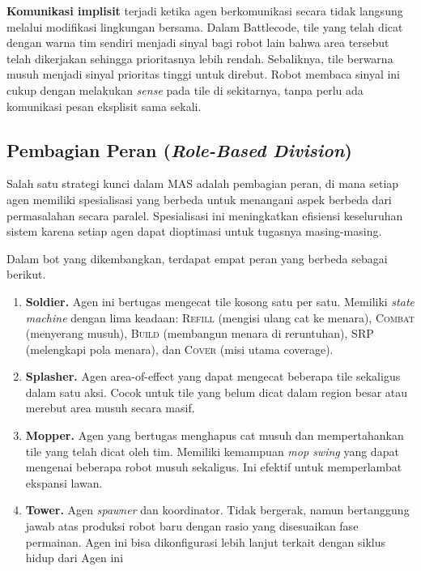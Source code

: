 \textbf{Komunikasi implisit} terjadi ketika agen berkomunikasi secara tidak langsung melalui modifikasi lingkungan bersama. Dalam Battlecode, tile yang telah dicat dengan warna tim sendiri menjadi sinyal bagi robot lain bahwa area tersebut telah dikerjakan sehingga prioritasnya lebih rendah. Sebaliknya, tile berwarna musuh menjadi sinyal prioritas tinggi untuk direbut. Robot membaca sinyal ini cukup dengan melakukan \textit{sense} pada tile di sekitarnya, tanpa perlu ada komunikasi pesan eksplisit sama sekali.

\subsection{Pembagian Peran (\textit{Role-Based Division})}

Salah satu strategi kunci dalam MAS adalah pembagian peran, di mana setiap agen memiliki spesialisasi yang berbeda untuk menangani aspek berbeda dari permasalahan secara paralel. Spesialisasi ini meningkatkan efisiensi keseluruhan sistem karena setiap agen dapat dioptimasi untuk tugasnya masing-masing.

Dalam bot yang dikembangkan, terdapat empat peran yang berbeda sebagai berikut.

\begin{enumerate}
  \item \textbf{Soldier.} Agen ini bertugas mengecat tile kosong satu per satu. Memiliki \textit{state machine} dengan lima keadaan: \textsc{Refill} (mengisi ulang cat ke menara), \textsc{Combat} (menyerang musuh), \textsc{Build} (membangun menara di reruntuhan), \textsc{SRP} (melengkapi pola menara), dan \textsc{Cover} (misi utama coverage).

  \item \textbf{Splasher.} Agen area-of-effect yang dapat mengecat beberapa tile sekaligus dalam satu aksi. Cocok untuk tile yang belum dicat dalam region besar atau merebut area musuh secara masif.

  \item \textbf{Mopper.} Agen yang bertugas menghapus cat musuh dan mempertahankan tile yang telah dicat oleh tim. Memiliki kemampuan \textit{mop swing} yang dapat mengenai beberapa robot musuh sekaligus. Ini efektif untuk memperlambat ekspansi lawan.

  \item \textbf{Tower.} Agen \textit{spawner} dan koordinator. Tidak bergerak, namun bertanggung jawab atas produksi robot baru dengan rasio yang disesuaikan fase permainan. Agen ini bisa dikonfigurasi lebih lanjut terkait dengan siklus hidup dari Agen ini
\end{enumerate}


